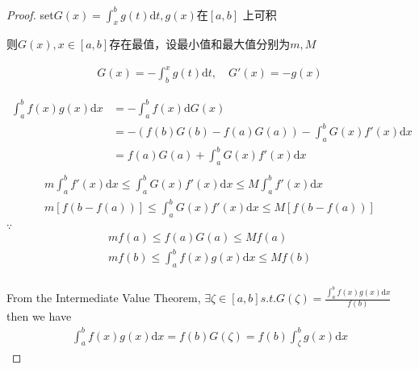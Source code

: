 \begin{proof}
set$ G(x) = \int_{x}^{b}g(t)\text{d}t , g(x)\text{在}[a,b] $	上可积

则$ G(x),x\in [a,b] $存在最值，设最小值和最大值分别为$ m,M $

\begin{align*}
	G(x) = -\int_{b}^{x}g(t)\text{d}t,\quad  G'(x) = -g(x)
\end{align*}

\begin{equation}
\begin{aligned}
	\int_{a}^{b}f(x)g(x)\text{d}x &= -\int_{a}^{b}f(x)\text{d}G(x)\\
	&=-{(f(b)G(b) - f(a)G(a)) -\int_{a}^{b}G(x)f'(x)\text{d}x }\\
	&= f(a)G(a)+ \int_{a}^{b}G(x)f'(x)\text{d}x\\
\end{aligned}
\end{equation}
\begin{align*}
	m\int_{a}^{b}f'(x)\text{d}x \leqslant \int_{a}^{b} G(x)f'(x)\text{d}x \leqslant M\int_{a}^{b}f'(x)\text{d}x\\
	m[f(b-f(a))] \leqslant  \int_{a}^{b} G(x)f'(x)\text{d}x \leqslant M[f(b-f(a))]\\
\end{align*}
$ \because $
\begin{align*}
	mf(a) \leqslant  f(a)G(a) \leqslant Mf(a)\\	
	mf(b) \leqslant  \int_{a}^{b} f(x)g(x) \text{d}x \leqslant Mf(b)\\	
\end{align*}


From the Intermediate Value Theorem, $ \exists \zeta \in [a,b] s.t. G(\zeta) = \frac{\int_{a}^{b}f(x)g(x)\text{d}x}{f(b)} $\\
then we have
\begin{align*}
	\int_{a}^{b}f(x)g(x)\text{d}x = f(b)G(\zeta) = f(b)\int_{\zeta}^{b}g(x)\text{d}x
\end{align*}


\end{proof}



